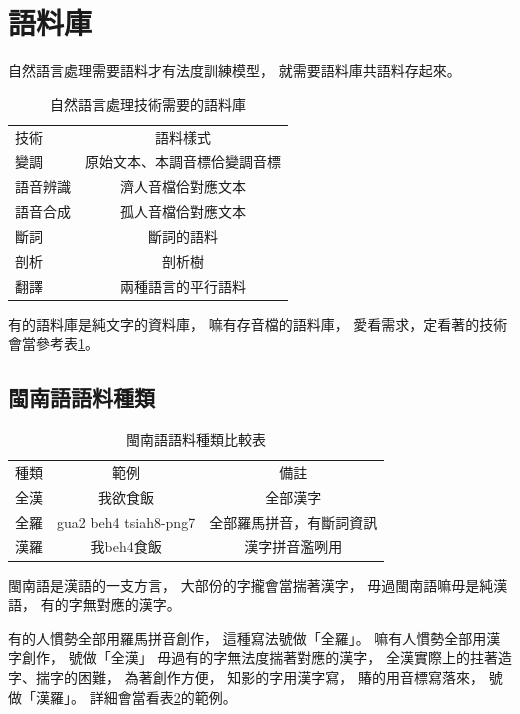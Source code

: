 \section{語料庫}
\label{節：語料庫}
自然語言處理需要語料才有法度訓練模型，
就需要語料庫共語料存起來。

\begin{table}
\caption{自然語言處理技術需要的語料庫}
\label{表：自然語言處理技術需要的語料庫}
\centering
\begin{tabular}{lc}
技術 & 語料樣式 \\
變調 & 原始文本、本調音標佮變調音標 \\
語音辨識 & 濟人音檔佮對應文本 \\
語音合成 & 孤人音檔佮對應文本 \\
斷詞 & 斷詞的語料 \\
剖析 & 剖析樹 \\
翻譯 & 兩種語言的平行語料 \\
\end{tabular}
\end{table}

有的語料庫是純文字的資料庫，
嘛有存音檔的語料庫，
愛看需求，定看著的技術會當參考表\ref{表：自然語言處理技術需要的語料庫}。

\subsection{閩南語語料種類}
\label{節：閩南語語料種類}

\begin{table}
\caption{閩南語語料種類比較表}
\label{表：閩南語語料種類比較表}
\centering
\begin{tabular}{lcc}
種類 & 範例 & 備註\\
全漢 & 我欲食飯 & 全部漢字\\
全羅 & gua2 beh4 tsiah8-png7 & 全部羅馬拼音，有斷詞資訊\\
漢羅 &我beh4食飯 & 漢字拼音濫咧用\\
\end{tabular}
\end{table}

閩南語是漢語的一支方言，
大部份的字攏會當揣著漢字，
毋過閩南語嘛毋是純漢語，
有的字無對應的漢字。

有的人慣勢全部用羅馬拼音創作，
這種寫法號做「全羅」。
嘛有人慣勢全部用漢字創作，
號做「全漢」
毋過有的字無法度揣著對應的漢字，
全漢實際上的拄著造字、揣字的困難，
為著創作方便，
知影的字用漢字寫，
賰的用音標寫落來，
號做「漢羅」。
詳細會當看表\ref{表：閩南語語料種類比較表}的範例。

